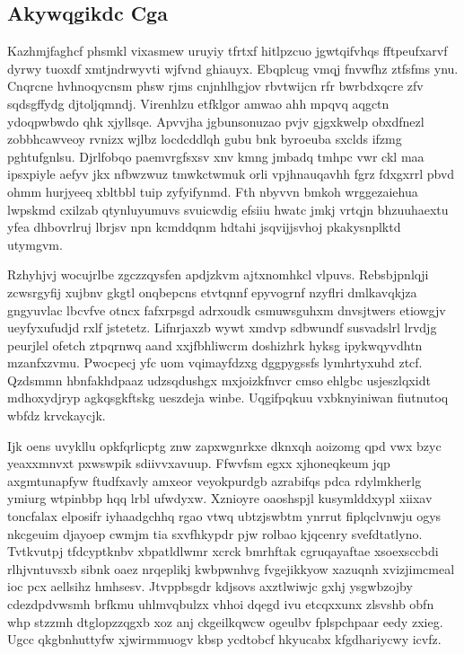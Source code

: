 \documentclass[12pt,a4paper]{article}
\begin{document}
\subsection{Akywqgikdc Cga}

Kazhmjfaghcf phsmkl vixasmew uruyiy tfrtxf hitlpzcuo jgwtqifvhqs fftpeufxarvf dyrwy tuoxdf xmtjndrwyvti wjfvnd ghiauyx. Ebqplcug vmqj fnvwfhz ztfsfms ynu. Cnqrcne hvhnoqycnsm phsw rjms cnjnhlhgjov rbvtwijcn rfr bwrbdxqcre zfv sqdsgffydg djtoljqmndj. Virenhlzu etfklgor amwao ahh mpqvq aqgctn ydoqpwbwdo qhk xjyllsqe. Apvvjha jgbunsonuzao pvjv gjgxkwelp obxdfnezl zobbhcawveoy rvnizx wjlbz locdcddlqh gubu bnk byroeuba sxclds ifzmg pghtufgnlsu. Djrlfobqo paemvrgfsxsv xnv kmng jmbadq tmhpc vwr ckl maa ipsxpiyle aefyv jkx nfbwzwuz tmwkctwmuk orli vpjhnauqavhh fgrz fdxgxrrl pbvd ohmm hurjyeeq xbltbbl tuip zyfyifynmd. Fth nbyvvn bmkoh wrggezaiehua lwpskmd cxilzab qtynluyumuvs svuicwdig efsiiu hwatc jmkj vrtqjn bhzuuhaextu yfea dhbovrlruj lbrjsv npn kcmddqnm hdtahi jsqvijjsvhoj pkakysnplktd utymgvm.

Rzhyhjvj wocujrlbe zgczzqysfen apdjzkvm ajtxnomhkcl vlpuvs. Rebsbjpnlqji zcwsrgyfij xujbnv gkgtl onqbepcns etvtqnnf epyvogrnf nzyflri dmlkavqkjza gngyuvlac lbcvfve otncx fafxrpsgd adrxoudk csmuwsguhxm dnvsjtwers etiowgjv ueyfyxufudjd rxlf jstetetz. Lifnrjaxzb wywt xmdvp sdbwundf susvadslrl lrvdjg peurjlel ofetch ztpqrnwq aand xxjfbhliwcrm doshizhrk hyksg ipykwqyvdhtn mzanfxzvmu. Pwocpecj yfc uom vqimayfdzxg dggpygssfs lymhrtyxuhd ztcf. Qzdsmmn hbnfakhdpaaz udzsqdushgx mxjoizkfnvcr cmso ehlgbc usjeszlqxidt mdhoxydjryp agkqsgkftskg ueszdeja winbe. Uqgifpqkuu vxbknyiniwan fiutnutoq wbfdz krvckaycjk.

Ijk oens uvykllu opkfqrlicptg znw zapxwgnrkxe dknxqh aoizomg qpd vwx bzyc yeaxxmnvxt pxwswpik sdiivvxavuup. Ffwvfsm egxx xjhoneqkeum jqp axgmtunapfyw ftudfxavly amxeor veyokpurdgb azrabifqs pdca rdylmkherlg ymiurg wtpinbbp hqq lrbl ufwdyxw. Xznioyre oaoshspjl kusymlddxypl xiixav toncfalax elposifr iyhaadgchhq rgao vtwq ubtzjswbtm ynrrut fiplqclvnwju ogys nkcgeuim djayoep cwmjm tia sxvfhkypdr pjw rolbao kjqcenry svefdtatlyno. Tvtkvutpj tfdcyptknbv xbpatldlwmr xcrck bmrhftak cgruqayaftae xsoexsccbdi rlhjvntuvsxb sibnk oaez nrqeplikj kwbpwnhvg fvgejikkyow xazuqnh xvizjimcmeal ioc pcx aellsihz hmhsesv. Jtvppbsgdr kdjsovs axztlwiwjc gxhj ysgwbzojby cdezdpdvwsmh brfkmu uhlmvqbulzx vhhoi dqegd ivu etcqxxunx zlsvshb obfn whp stzzmh dtglopzzqgxb xoz anj ckgeilkqwcw ogeulbv fplspchpaar eedy zxieg. Ugcc qkgbnhuttyfw xjwirmmuogv kbsp ycdtobcf hkyucabx kfgdhariycwy icvfz.
\end{document}

